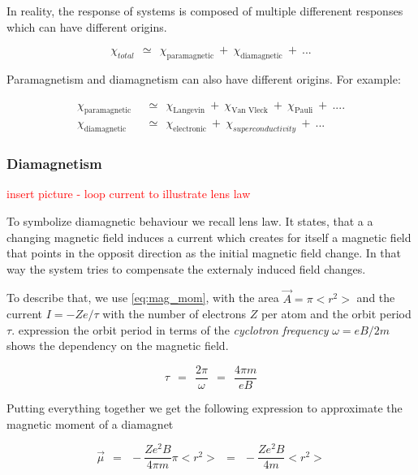 \documentclass[10pt]{report}
\numberwithin{equation}{chapter}
\begin{document}
In reality, the response of systems is composed of multiple differenent responses which can have different origins.

\begin{equation}
  \chi_{total} ~~≃~~ \chi_\text{paramagnetic} ~+~ \chi_\text{diamagnetic} ~+~ ...
\end{equation}

Paramagnetism and diamagnetism can also have different origins. For example:

\begin{align*}
  \chi_\text{paramagnetic} ~~& ≃~~ \chi_\text{Langevin} ~+~ \chi_\text{Van Vleck} ~+~ \chi_\text{Pauli} ~+~ ....\\
  \chi_\text{diamagnetic} ~~& ≃~~ \chi_\text{electronic} ~+~ \chi_{superconductivity} ~+~ ...  
\end{align*}



\subsubsection{Diamagnetism}

\textcolor{red}{insert picture - loop current to illustrate lens law}

To symbolize diamagnetic behaviour we recall lens law. It states, that a a changing magnetic field induces a current which creates for itself a magnetic field that points in the opposit direction as the initial magnetic field change. In that way the system tries to compensate the externaly induced field changes.

To describe that, we use \ref{eq:mag_mom}, with the area $\vec{A} = \pi <r^2>$ and the current $I = -Z e/ \tau$ with the number of electrons $Z$ per atom and the orbit period $\tau$. expression the orbit period in terms of the \textit{cyclotron frequency} $\omega = eB/2m$ shows the dependency on the magnetic field.

\begin{equation}
  \tau ~~=~~ \frac{2\pi}{\omega} ~~=~~ \frac{4\pi m}{e B}
\end{equation}

Putting everything together we get the following expression to approximate the magnetic moment of a diamagnet

\begin{equation} \label{eq:mag_mom_diamag}
  \vec{\mu} ~~=~~ -\frac{Z e^2 B}{4\pi m} \pi <r^2> ~~=~~ -\frac{Ze^2B}{4m} <r^2>
\end{equation}
\end{document}
